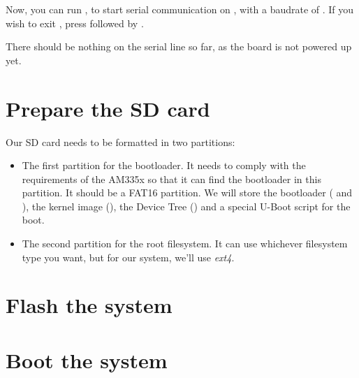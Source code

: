 Now, you can run , to start
serial communication on , with a baudrate of
. If you wish to exit , press
\code{[Ctrl][a]} followed by \code{[Ctrl][x]}.

There should be nothing on the serial line so far, as the board is not
powered up yet.

\section{Prepare the SD card}

Our SD card needs to be formatted in two partitions:

\begin{itemize}

\item The first partition for the bootloader. It needs to comply with
  the requirements of the AM335x so that it can find the bootloader in
  this partition. It should be a FAT16 partition. We will store the
  bootloader ( and ), the kernel image
  (), the Device Tree () and a
  special U-Boot script for the boot.

\item The second partition for the root filesystem. It can use
  whichever filesystem type you want, but for our system, we'll use
  {\em ext4}.

\end{itemize}

\section{Flash the system}

\section{Boot the system}

